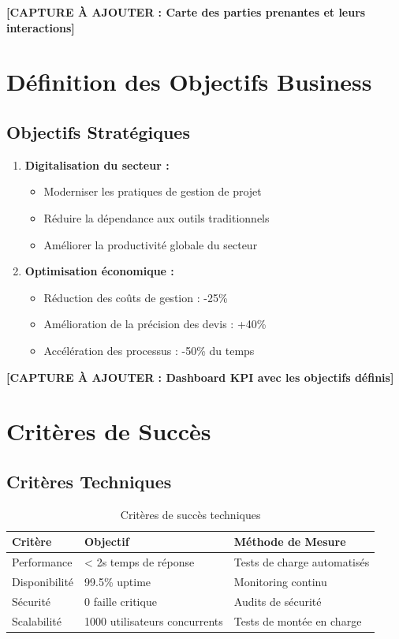 \textbf{[CAPTURE À AJOUTER : Carte des parties prenantes et leurs interactions]}

\section{Définition des Objectifs Business}

\subsection{Objectifs Stratégiques}

\begin{enumerate}
    \item \textbf{Digitalisation du secteur :}
    \begin{itemize}
        \item Moderniser les pratiques de gestion de projet
        \item Réduire la dépendance aux outils traditionnels
        \item Améliorer la productivité globale du secteur
    \end{itemize}
    
    \item \textbf{Optimisation économique :}
    \begin{itemize}
        \item Réduction des coûts de gestion : -25\%
        \item Amélioration de la précision des devis : +40\%
        \item Accélération des processus : -50\% du temps
    \end{itemize}
\end{enumerate}

\textbf{[CAPTURE À AJOUTER : Dashboard KPI avec les objectifs définis]}

\section{Critères de Succès}

\subsection{Critères Techniques}

\begin{table}[h]
\centering
\begin{tabular}{|l|l|l|}
\hline
\textbf{Critère} & \textbf{Objectif} & \textbf{Méthode de Mesure} \\
\hline
Performance & < 2s temps de réponse & Tests de charge automatisés \\
\hline
Disponibilité & 99.5\% uptime & Monitoring continu \\
\hline
Sécurité & 0 faille critique & Audits de sécurité \\
\hline
Scalabilité & 1000 utilisateurs concurrents & Tests de montée en charge \\
\hline
\end{tabular}
\caption{Critères de succès techniques}
\end{table}

